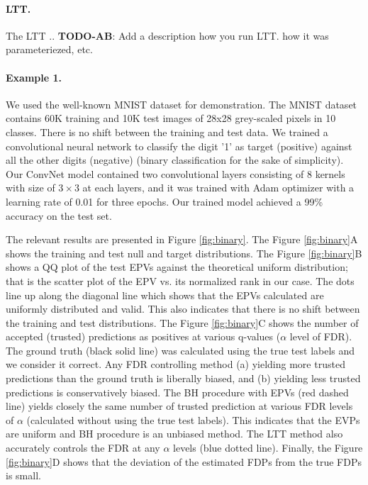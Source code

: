 \documentclass{article}
\newcommand{\todo}[2]{{\color{red} {\bf TODO-#1}: #2}}
\begin{document}
\paragraph{LTT.} The LTT .. \todo{AB}{Add a description how you run LTT. how it was parameteriezed, etc.}

\paragraph{Example 	 1.} \label{ex:vanilla} We used the well-known MNIST dataset for demonstration. The MNIST dataset contains 60K training and 10K test images of 28x28 grey-scaled pixels in 10 classes. There is no shift between the training and test data. We trained a convolutional neural network to classify the digit '1' as target (positive) against all the other digits (negative) (binary classification for the sake of simplicity). Our ConvNet model contained two convolutional layers consisting of 8 kernels with size of $3\times3$ at each layers, and it was trained with Adam optimizer with a learning rate of 0.01 for three epochs. Our trained model achieved a 99\% accuracy on the test set. 

The relevant results are presented in Figure \ref{fig:binary}. The Figure \ref{fig:binary}A shows the training and test null and target distributions. %
The Figure \ref{fig:binary}B shows a QQ plot of the test EPVs against the theoretical uniform distribution; that is the scatter plot of the EPV vs. its normalized rank in our case. The dots line up along the diagonal line which shows that the EPVs calculated are uniformly distributed and valid. This also indicates that there is no shift between the training and test distributions. %
The Figure \ref{fig:binary}C shows the number of accepted (trusted) predictions as positives at various q-values ($\alpha$ level of FDR). The ground truth (black solid line) was calculated using the true test labels and we consider it correct. Any FDR controlling method (a) yielding more trusted predictions than the ground truth is liberally biased, and (b) yielding less trusted predictions is conservatively biased. The BH procedure with EPVs (red dashed line) yields closely the same number of trusted prediction at various FDR levels of $\alpha$ (calculated without using the true test labels). This indicates that the EVPs are uniform and BH procedure is an unbiased method. The LTT method also accurately controls the FDR at any $\alpha$ levels (blue dotted line). Finally, the Figure \ref{fig:binary}D shows that the deviation of the estimated FDPs from the true FDPs is small.
\end{document}
